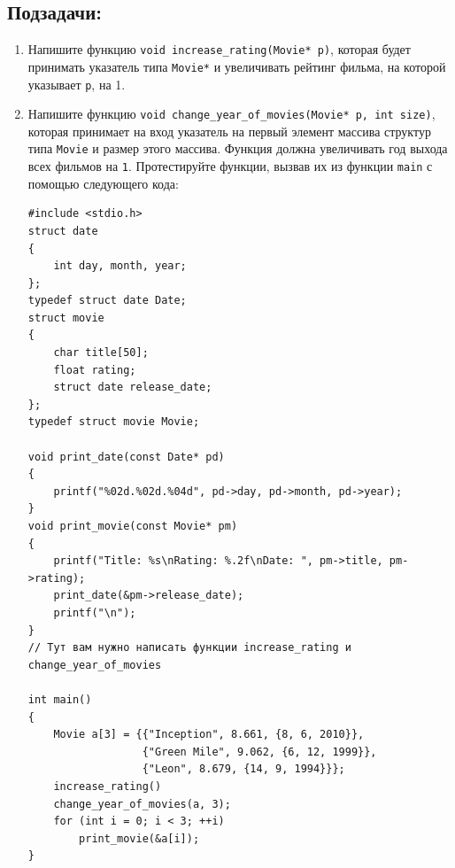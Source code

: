 \documentclass{article}
\begin{document}
\subsection*{Подзадачи:}
\begin{enumerate}

\item Напишите функцию \texttt{void increase\_rating(Movie* p)}, которая будет принимать указатель типа \texttt{Movie*} и увеличивать рейтинг фильма, на которой указывает \texttt{p}, на 1.

\item Напишите функцию \texttt{void change\_year\_of\_movies(Movie* p, int size)}, которая принимает на вход указатель на первый элемент массива структур типа \texttt{Movie} и размер этого массива. Функция должна увеличивать год выхода всех фильмов на \texttt{1}. Протестируйте функции, вызвав их из функции \texttt{main} с помощью следующего кода:

\begin{lstlisting}
#include <stdio.h>
struct date 
{
    int day, month, year;
};
typedef struct date Date;
struct movie 
{
    char title[50];
    float rating;
    struct date release_date;
};
typedef struct movie Movie;

void print_date(const Date* pd) 
{
    printf("%02d.%02d.%04d", pd->day, pd->month, pd->year);
}
void print_movie(const Movie* pm) 
{
    printf("Title: %s\nRating: %.2f\nDate: ", pm->title, pm->rating);
    print_date(&pm->release_date);
    printf("\n");
}
// Тут вам нужно написать функции increase_rating и change_year_of_movies

int main() 
{
    Movie a[3] = {{"Inception", 8.661, {8, 6, 2010}}, 
                  {"Green Mile", 9.062, {6, 12, 1999}}, 
                  {"Leon", 8.679, {14, 9, 1994}}};
    increase_rating()
    change_year_of_movies(a, 3);
    for (int i = 0; i < 3; ++i)
        print_movie(&a[i]);
}
\end{lstlisting}

\end{enumerate}
\end{document}
